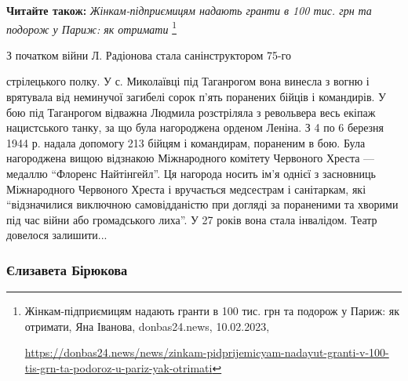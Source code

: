 \textbf{Читайте також:} \emph{Жінкам-підприємицям надають гранти в 100 тис. грн та подорож у Париж: як отримати}%
\footnote{Жінкам-підприємицям надають гранти в 100 тис. грн та подорож у Париж: як отримати, Яна Іванова, donbas24.news, 10.02.2023, \par%
\url{https://donbas24.news/news/zinkam-pidprijemicyam-nadayut-granti-v-100-tis-grn-ta-podoroz-u-pariz-yak-otrimati}%
}


З початком війни Л. Радіонова стала санінструктором 75-го\par\noindent стрілецького полку. У
с. Миколаївці під Таганрогом вона винесла з вогню і врятувала від неминучої
загибелі сорок п'ять поранених бійців і командирів. У бою під Таганрогом
відважна Людмила розстріляла з револьвера весь екіпаж нацистського танку, за що
була нагороджена орденом Леніна. З 4 по 6 березня 1944 р. надала допомогу 213
бійцям і командирам, пораненим в бою. Була нагороджена вищою відзнакою
Міжнародного комітету Червоного Хреста — медаллю \enquote{Флоренс Найтінгейл}. Ця
нагорода носить ім'я однієї з засновниць Міжнародного Червоного Хреста і
вручається медсестрам і санітаркам, які \enquote{відзначилися виключною самовідданістю
при догляді за пораненими та хворими під час війни або громадського лиха}. У 27
років вона стала інвалідом. Театр довелося залишити...

\subsubsection{Єлизавета Бірюкова}


